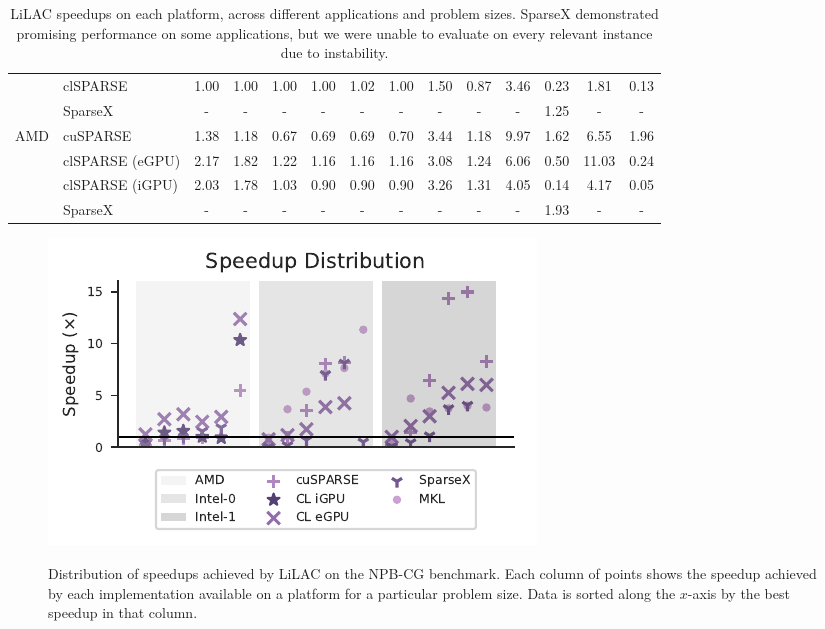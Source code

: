 \begin{table}[t]
\begin{tabular}{ll|ccc|ccc|ccc|ccc}
    & clSPARSE & 1.00 & 1.00 & 1.00 & 1.00 & 1.02 & 1.00 & 1.50 & 0.87 & 3.46 & 0.23 & 1.81 & 0.13 \\[-0.3em]
    & SparseX & - & - & - & - & - & - & - & - & - & 1.25 & - & - \\
    \hline
    \multirow{4}{*}{AMD}
    & cuSPARSE & 1.38 & 1.18 & 0.67 & 0.69 & 0.69 & 0.70 & 3.44 & 1.18 & 9.97 & 1.62 & 6.55 & 1.96 \\[-0.3em]
    & clSPARSE (eGPU) & 2.17 & 1.82 & 1.22 & 1.16 & 1.16 & 1.16 & 3.08 & 1.24 & 6.06 & 0.50 & 11.03 & 0.24 \\[-0.3em]
    & clSPARSE (iGPU) & 2.03 & 1.78 & 1.03 & 0.90 & 0.90 & 0.90 & 3.26 & 1.31 & 4.05 & 0.14 & 4.17 & 0.05 \\[-0.3em]
    & SparseX & - & - & - & - & - & - & - & - & - & 1.93 & - & - \\
  \end{tabular}
\vspace{0.5em}
  \caption{LiLAC speedups on each platform, across different applications and
  problem sizes.
  SparseX demonstrated promising performance on some applications, but we were
  unable to evaluate on every relevant instance due to instability.}
  \label{tab:perf_data}
\vspace{-2em}
\end{table}

\begin{figure}[t]
  \centering
  \includegraphics[width=\columnwidth,height=0.67\columnwidth]{figures/distribution.pdf}
\\[-0.75em]
  \caption{Distribution of speedups achieved by LiLAC on the NPB-CG benchmark.
    Each column of points shows the speedup achieved by each implementation
    available on a platform for a particular problem size. Data is sorted along
  the $x$-axis by the best speedup in that column.}
  \label{fig:performance-distribution}
\end{figure}


